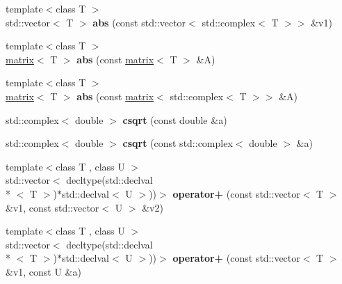 \begin{DoxyCompactItemize}
\item 
\hypertarget{namespacekeycpp_acce9304ff511ac2e50ad3016045f22f6}{{\footnotesize template$<$class T $>$ }\\std\-::vector$<$ T $>$ {\bfseries abs} (const std\-::vector$<$ std\-::complex$<$ T $>$$>$ \&v1)}\label{namespacekeycpp_acce9304ff511ac2e50ad3016045f22f6}

\item 
\hypertarget{namespacekeycpp_a1f83b48bfedf753904dfea9dde554a4c}{{\footnotesize template$<$class T $>$ }\\\hyperlink{classkeycpp_1_1matrix}{matrix}$<$ T $>$ {\bfseries abs} (const \hyperlink{classkeycpp_1_1matrix}{matrix}$<$ T $>$ \&A)}\label{namespacekeycpp_a1f83b48bfedf753904dfea9dde554a4c}

\item 
\hypertarget{namespacekeycpp_ae0edec63f48a81c576da0c0ffc768af9}{{\footnotesize template$<$class T $>$ }\\\hyperlink{classkeycpp_1_1matrix}{matrix}$<$ T $>$ {\bfseries abs} (const \hyperlink{classkeycpp_1_1matrix}{matrix}$<$ std\-::complex$<$ T $>$$>$ \&A)}\label{namespacekeycpp_ae0edec63f48a81c576da0c0ffc768af9}

\item 
\hypertarget{namespacekeycpp_a952e5296774667c3be4e792b5cd980da}{std\-::complex$<$ double $>$ {\bfseries csqrt} (const double \&a)}\label{namespacekeycpp_a952e5296774667c3be4e792b5cd980da}

\item 
\hypertarget{namespacekeycpp_a8faa7912f1f198c5185cb6a36cfd2fb2}{std\-::complex$<$ double $>$ {\bfseries csqrt} (const std\-::complex$<$ double $>$ \&a)}\label{namespacekeycpp_a8faa7912f1f198c5185cb6a36cfd2fb2}

\item 
\hypertarget{namespacekeycpp_a4da6882977b2262f8d6f080b0eaf60c5}{{\footnotesize template$<$class T , class U $>$ }\\std\-::vector$<$ decltype(std\-::declval\\*
$<$ T $>$)$\ast$std\-::declval$<$ U $>$))$>$ {\bfseries operator+} (const std\-::vector$<$ T $>$ \&v1, const std\-::vector$<$ U $>$ \&v2)}\label{namespacekeycpp_a4da6882977b2262f8d6f080b0eaf60c5}

\item 
\hypertarget{namespacekeycpp_a1c1cd804c6f704b7a9124a9d9a82c325}{{\footnotesize template$<$class T , class U $>$ }\\std\-::vector$<$ decltype(std\-::declval\\*
$<$ T $>$)$\ast$std\-::declval$<$ U $>$))$>$ {\bfseries operator+} (const std\-::vector$<$ T $>$ \&v1, const U \&a)}\label{namespacekeycpp_a1c1cd804c6f704b7a9124a9d9a82c325}


\end{DoxyCompactItemize}
